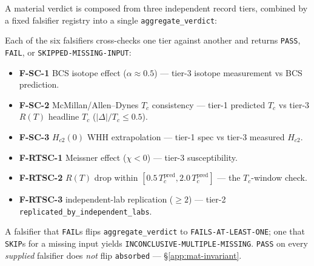 A material verdict is composed from three independent record tiers,
combined by a fixed falsifier registry into a single
\texttt{aggregate\_verdict}:
\begin{center}
\end{center}
Each of the six falsifiers cross-checks one tier against another and
returns \texttt{PASS}, \texttt{FAIL}, or \texttt{SKIPPED-MISSING-INPUT}:
\begin{itemize}\itemsep0.15em\footnotesize
\item \textbf{F-SC-1} BCS isotope effect ($\alpha\!\approx\!0.5$) ---
  tier-3 isotope measurement vs BCS prediction.
\item \textbf{F-SC-2} McMillan/Allen--Dynes $T_c$ consistency --- tier-1
  predicted $T_c$ vs tier-3 $R(T)$ headline $T_c$ ($|\Delta|/T_c\!\le\!0.5$).
\item \textbf{F-SC-3} $H_{c2}(0)$ WHH extrapolation --- tier-1 spec vs
  tier-3 measured $H_{c2}$.
\item \textbf{F-RTSC-1} Meissner effect ($\chi\!<\!0$) --- tier-3
  susceptibility.
\item \textbf{F-RTSC-2} $R(T)$ drop within $[0.5\,T_c^{\text{pred}},
  2.0\,T_c^{\text{pred}}]$ --- the $T_c$-window check.
\item \textbf{F-RTSC-3} independent-lab replication ($\ge\!2$) --- tier-2
  \texttt{replicated\_by\_independent\_labs}.
\end{itemize}
A falsifier that \texttt{FAIL}s flips \texttt{aggregate\_verdict} to
\texttt{FAILS-AT-LEAST-ONE}; one that \texttt{SKIP}s for a missing input
yields \texttt{INCONCLUSIVE-MULTIPLE-MISSING}. \texttt{PASS} on every
\emph{supplied} falsifier does \emph{not} flip \texttt{absorbed} ---
\S\ref{app:mat-invariant}.


